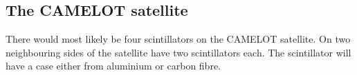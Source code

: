 \documentclass[12pt, a4paper,titlepage]{article}
\numberwithin{equation}{section}
\numberwithin{figure}{section}
\begin{document}

\subsection{The CAMELOT satellite}

There would most likely be four scintillators on the CAMELOT satellite. On two neighbouring sides of the satellite have two scintillators each. The scintillator will have a case either from aluminium or carbon fibre.
\end{document}
